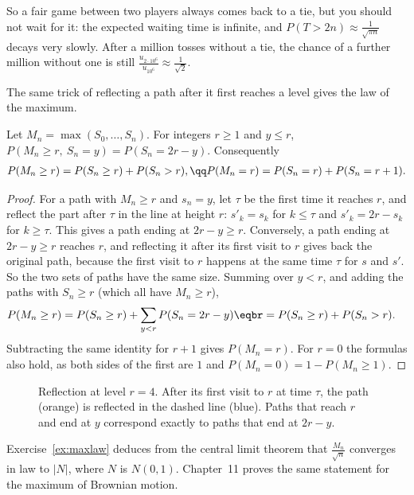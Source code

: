So a fair game between two players always comes back to a tie, but you should not wait for it: the expected waiting
time is infinite, and $P(T>2n)\approx\frac1{\sqrt{\pi n}}$ decays very slowly. After a million tosses without a tie, the
chance of a further million without one is still $\frac{u_{2\cdot10^6}}{u_{10^6}}\approx\frac1{\sqrt2}$.

The same trick of reflecting a path after it first reaches a level gives the law of the maximum.

\begin{proposition}\label{prop:maximum}
Let $M_n=\max(S_0,\dots,S_n)$. For integers $r\ge1$ and $y\le r$, $P(M_n\ge r,\ S_n=y)=P(S_n=2r-y)$. Consequently
\[
\begin{gathered}P(M_n\ge r)=P(S_n\ge r)+P(S_n>r),\qq P(M_n=r)=P(S_n=r)+P(S_n=r+1).\end{gathered}
\]
\end{proposition}
\begin{proof}
For a path with $M_n\ge r$ and $s_n=y$, let $\tau$ be the first time it reaches $r$, and reflect the part after $\tau$ in the
line at height $r$: $s'_k=s_k$ for $k\le\tau$ and $s'_k=2r-s_k$ for $k\ge\tau$. This gives a path ending at $2r-y\ge r$. Conversely, a
path ending at $2r-y\ge r$ reaches $r$, and reflecting it after its first visit to $r$ gives back the original path,
because the first visit to $r$ happens at the same time $\tau$ for $s$ and $s'$. So the two sets of paths have the same size.
Summing over $y<r$, and adding the paths with $S_n\ge r$ (which all have $M_n\ge r$),
\[
\begin{aligned}P(M_n\ge r)&=P(S_n\ge r)+\sum_{y<r}P(S_n=2r-y)\eqbr=P(S_n\ge r)+P(S_n>r).\end{aligned}
\]
Subtracting the same identity for $r+1$ gives $P(M_n=r)$. For $r=0$ the formulas also hold, as both sides of the
first are $1$ and $P(M_n=0)=1-P(M_n\ge1)$.
\end{proof}

\begin{figure}[ht]
\centering
{}
\caption{Reflection at level $r=4$. After its first visit to $r$ at time $\tau$, the path (orange) is reflected in the
dashed line (blue). Paths that reach $r$ and end at $y$ correspond exactly to paths that end at $2r-y$.}
\label{fig:reflect}
\end{figure}

Exercise~\ref{ex:maxlaw} deduces from the central limit theorem that $\frac{M_n}{\sqrt n}$ converges in law to $|N|$, where $N$ is
$N(0,1)$. Chapter~11 proves the same statement for the maximum of Brownian motion.

